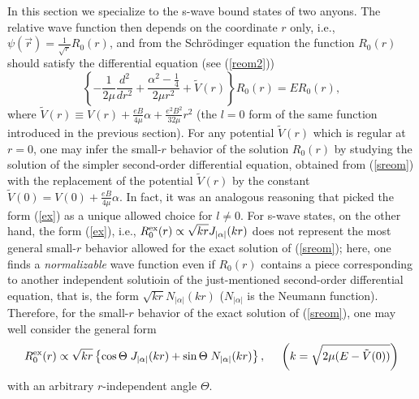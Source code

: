 \documentclass[a4paper,aps,eqsecnum,preprint,preprintnumbers,12pt]{revtex4}
\begin{document}
In this section we specialize to the s-wave bound states of two
anyons. The relative wave function then depends on the coordinate
$r$ only, i.e., $\psi(\vec{r}) = \displaystyle \frac{1}{\sqrt{r}}
R_{0}(r)$, and from the Schr\"{o}dinger equation the function
$R_{0}(r)$ should satisfy the differential equation (see
(\ref{reom2}))
\begin{equation} \label{sreom}
\left\{ - \frac{1}{2\mu} \frac{d^{2}}{dr^{2}} + \frac{ \alpha^{2}
- \frac{1}{4} }{2\mu r^{2}} + \tilde{V}(r) \right\} R_{0}(r) = E
R_{0}(r),
\end{equation}
where $\tilde{V}(r) \equiv V(r) + \displaystyle \frac{eB}{4\mu}
\alpha + \frac{e^{2}B^{2}}{32\mu} r^{2}$ (the $l=0$ form of the
same function introduced in the previous section). For any
potential $\tilde{V}(r)$ which is regular at $r=0$, one may infer
the small-$r$ behavior of the solution $R_{0}(r)$ by studying the
solution of the simpler second-order differential equation,
obtained from (\ref{sreom}) with the replacement of the potential
$\tilde{V}(r)$ by the constant $\tilde{V}(0) = V(0) +
\displaystyle \frac{eB}{4\mu} \alpha$. In fact, it was an
analogous reasoning that picked the form (\ref{ex}) as a unique
allowed choice for $l \neq 0$. For s-wave states, on the other
hand, the form (\ref{ex}), i.e., $R_{0}^{\rm ex}(r) \propto
\sqrt{kr} J_{|\alpha|}(kr)$ does not represent the most general
small-$r$ behavior allowed for the exact solution of
(\ref{sreom}); here, one finds a {\it normalizable} wave function
even if $R_{0}(r)$ contains a piece corresponding to another
independent solutioin of the just-mentioned second-order
differential equation, that is, the form $\sqrt{kr}
N_{|\alpha|}(kr)$ ($N_{|\alpha|}$ is the Neumann function).
Therefore, for the small-$r$ behavior of the exact solution of
(\ref{sreom}), one may well consider the general form
\begin{equation} \label{sex}
R_{0}^{\rm ex}(r) \propto \sqrt{kr} \left\{ \cos\Theta \;
J_{|\alpha|}(kr) + \sin\Theta \; N_{|\alpha|}(kr) \right\},
\;\;\;\;\; \left( k = \sqrt{ 2\mu ( E - \tilde{V}(0) ) } \right)
\end{equation}
with an arbitrary $r$-independent angle $\Theta$.
\end{document}
